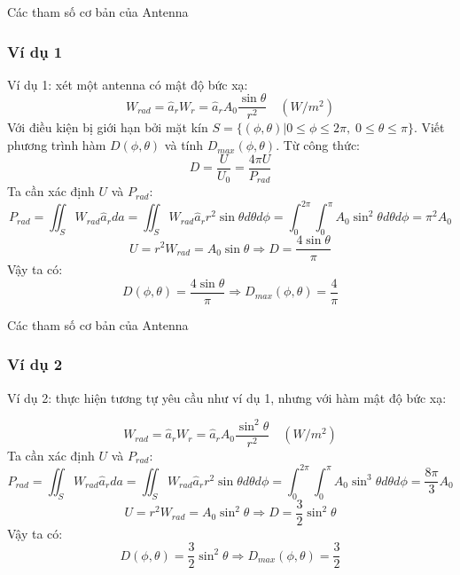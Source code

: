 \documentclass[8pt]{beamer}
\begin{document}
\begin{frame}{Các tham số cơ bản của Antenna}
\subsubsection{Ví dụ 1}
Ví dụ 1: xét một antenna có mật độ bức xạ:
$$W_{rad}=\hat a_{r}W_{r}=\hat a_{r}A_{0}\frac{\sin{\theta}}{r^2}\quad(W/m^2)$$
Với điều kiện bị giới hạn bởi mặt kín $S=\{(\phi,\theta)|0\leq\phi\leq2\pi,\;0\leq\theta\leq\pi\}$. Viết phương trình hàm $D(\phi,\theta)$ và tính $D_{max}(\phi,\theta)$.
Từ công thức: $$D=\frac{U}{U_{0}}=\frac{4\pi U}{P_{rad}}$$
Ta cần xác định $U$ và $P_{rad}$:
$$P_{rad}=\iint_{S}W_{rad}\hat a_{r}da=\iint_{S}W_{rad}\hat a_{r}r^2\sin{\theta}d\theta d\phi=\int_{0}^{2\pi}\int_{0}^{\pi}A_{0}\sin^2{\theta}d\theta d\phi=\pi^2A_{0}$$
$$U=r^2W_{rad}=A_{0}\sin{\theta}\Rightarrow D=\frac{4\sin{\theta}}{\pi}$$
Vậy ta có:
$$D(\phi,\theta)=\frac{4\sin{\theta}}{\pi}\Rightarrow D_{max}(\phi,\theta)=\frac{4}{\pi}$$

\end{frame}
\begin{frame}{Các tham số cơ bản của Antenna}
\subsubsection{Ví dụ 2}
Ví dụ 2: thực hiện tương tự yêu cầu như ví dụ 1, nhưng với hàm mật độ bức xạ:

$$W_{rad}=\hat a_{r}W_{r}=\hat a_{r}A_{0}\frac{\sin^2{\theta}}{r^2}\quad(W/m^2)$$
Ta cần xác định $U$ và $P_{rad}$:
$$P_{rad}=\iint_{S}W_{rad}\hat a_{r}da=\iint_{S}W_{rad}\hat a_{r}r^2\sin{\theta}d\theta d\phi=\int_{0}^{2\pi}\int_{0}^{\pi}A_{0}\sin^3{\theta}d\theta d\phi=\frac{8\pi}{3}A_{0}$$
$$U=r^2W_{rad}=A_{0}\sin^2{\theta}\Rightarrow D=\frac{3}{2}\sin^2{\theta}$$
Vậy ta có:
$$D(\phi,\theta)=\frac{3}{2}\sin^2{\theta}\Rightarrow D_{max}(\phi,\theta)=\frac{3}{2}$$
\end{frame}
\end{document}
